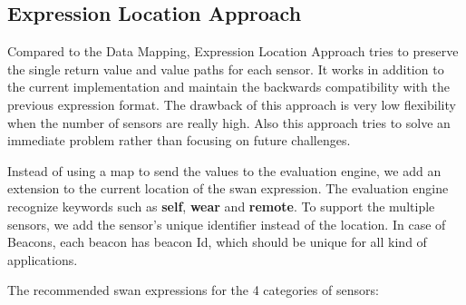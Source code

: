 
\subsection{Expression Location Approach} \label{sssec:exprlocation}
Compared to the Data Mapping, Expression Location Approach tries to preserve the single return value and value paths for each sensor.
It works in addition to the current implementation and maintain the backwards compatibility with the previous expression format.
The drawback of this approach is very low flexibility when the number of sensors are really high. Also this approach tries to solve an immediate 
problem rather than focusing on future challenges.

Instead of using a map to send the values to the evaluation engine, we add an extension to the current location of the swan expression.
The evaluation engine recognize keywords such as \textbf{self}, \textbf{wear} and \textbf{remote}. To support the multiple sensors, 
we add the sensor's unique identifier instead of the location. In case of Beacons, each beacon has beacon Id, which should be unique for 
all kind of applications.

The recommended swan expressions for the 4 categories of sensors:

